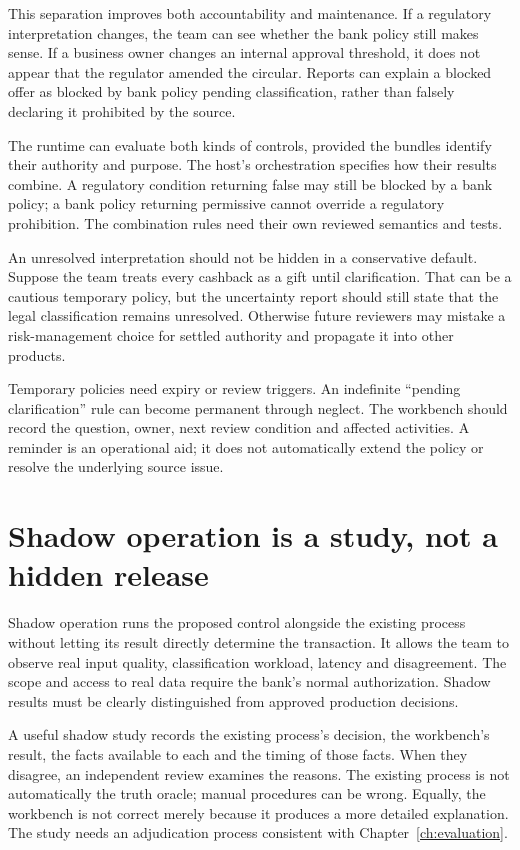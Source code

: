 \documentclass[12pt,a4paper,oneside,openany]{book}
\begin{document}
This separation improves both accountability and maintenance. If a regulatory
interpretation changes, the team can see whether the bank policy still makes sense.
If a business owner changes an internal approval threshold, it does not appear
that the regulator amended the circular. Reports can explain a blocked offer as
blocked by bank policy pending classification, rather than falsely declaring it
prohibited by the source.

The runtime can evaluate both kinds of controls, provided the bundles identify
their authority and purpose. The host's orchestration specifies how their results
combine. A regulatory condition returning false may still be blocked by a bank
policy; a bank policy returning permissive cannot override a regulatory
prohibition. The combination rules need their own reviewed semantics and tests.

An unresolved interpretation should not be hidden in a conservative default.
Suppose the team treats every cashback as a gift until clarification. That can be
a cautious temporary policy, but the uncertainty report should still state that
the legal classification remains unresolved. Otherwise future reviewers may
mistake a risk-management choice for settled authority and propagate it into
other products.

Temporary policies need expiry or review triggers. An indefinite ``pending
clarification'' rule can become permanent through neglect. The workbench should
record the question, owner, next review condition and affected activities. A
reminder is an operational aid; it does not automatically extend the policy or
resolve the underlying source issue.

\section{Shadow operation is a study, not a hidden release}
\label{merge:M10:03}


Shadow operation runs the proposed control alongside the existing process without
letting its result directly determine the transaction. It allows the team to
observe real input quality, classification workload, latency and disagreement.
The scope and access to real data require the bank's normal authorization.
Shadow results must be clearly distinguished from approved production decisions.

A useful shadow study records the existing process's decision, the workbench's
result, the facts available to each and the timing of those facts. When they
disagree, an independent review examines the reasons. The existing process is not
automatically the truth oracle; manual procedures can be wrong. Equally, the
workbench is not correct merely because it produces a more detailed explanation.
The study needs an adjudication process consistent with Chapter~\ref{ch:evaluation}.
\end{document}
